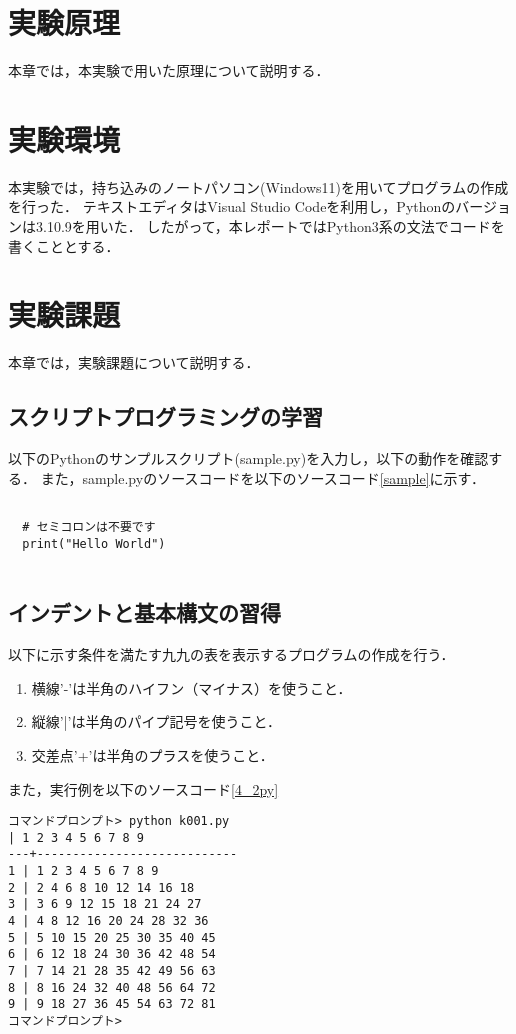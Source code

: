 \documentclass[uplatex,dvipdfmx,12pt]{jsarticle}
\begin{document}
\newpage
\section{実験原理}
本章では，本実験で用いた原理について説明する．

\newpage
\section{実験環境}
本実験では，持ち込みのノートパソコン(Windows11)を用いてプログラムの作成を行った．
テキストエディタはVisual Studio Codeを利用し，Pythonのバージョンは3.10.9を用いた．
したがって，本レポートではPython3系の文法でコードを書くこととする．

\newpage
\section{実験課題}\label{sec:kadai}
本章では，実験課題について説明する．
\subsection{スクリプトプログラミングの学習}
以下のPythonのサンプルスクリプト(sample.py)を入力し，以下の動作を確認する．
また，sample.pyのソースコードを以下のソースコード\ref{sample}に示す．

\begin{lstlisting}[caption=sample.py, label=sample]

  # セミコロンは不要です
  print("Hello World")
  
\end{lstlisting}

\subsection{インデントと基本構文の習得}
以下に示す条件を満たす九九の表を表示するプログラムの作成を行う．
\begin{enumerate}
  \item 横線'-'は半角のハイフン（マイナス）を使うこと．
  \item 縦線'|'は半角のパイプ記号を使うこと．
  \item 交差点'+'は半角のプラスを使うこと．
\end{enumerate}
また，実行例を以下のソースコード\ref{4_2py}
\begin{lstlisting}[caption=サンプルプログラムの実行例,label=4_2py]
  コマンドプロンプト> python k001.py
| 1 2 3 4 5 6 7 8 9
---+----------------------------
1 | 1 2 3 4 5 6 7 8 9
2 | 2 4 6 8 10 12 14 16 18
3 | 3 6 9 12 15 18 21 24 27
4 | 4 8 12 16 20 24 28 32 36
5 | 5 10 15 20 25 30 35 40 45
6 | 6 12 18 24 30 36 42 48 54
7 | 7 14 21 28 35 42 49 56 63
8 | 8 16 24 32 40 48 56 64 72
9 | 9 18 27 36 45 54 63 72 81
コマンドプロンプト>
\end{lstlisting}
\end{document}
